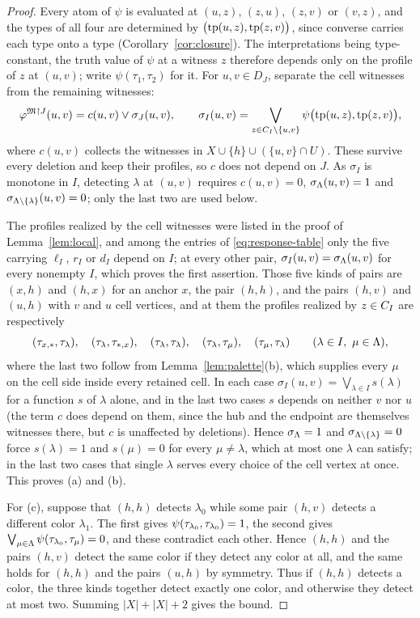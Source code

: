 \begin{proof}
Every atom of $\psi$ is evaluated at $(u,z)$, $(z,u)$, $(z,v)$ or $(v,z)$,
and the types of all four are determined by
$\bigl(\operatorname{tp}(u,z),\operatorname{tp}(z,v)\bigr)$, since converse carries each type onto a
type (Corollary~\ref{cor:closure}). The interpretations being
type-constant, the truth value of $\psi$ at a witness $z$ therefore depends
only on the profile of $z$ at $(u,v)$; write $\psi(\tau_1,\tau_2)$ for it.
For $u,v\in D_J$, separate the cell witnesses from the remaining
witnesses:
\[
 \varphi^{\mathfrak M\mathord{\restriction} J}(u,v)=c(u,v)\vee\sigma_J(u,v),\qquad
 \sigma_I(u,v)=\bigvee_{z\in C_{I}\setminus\{u,v\}}
 \psi\bigl(\operatorname{tp}(u,z),\operatorname{tp}(z,v)\bigr),
\]
where $c(u,v)$ collects the witnesses in $X\cup\{h\}\cup(\{u,v\}\cap U)$.
These survive every deletion and keep their profiles, so $c$ does not depend
on $J$. As $\sigma_I$ is monotone in $I$, detecting $\lambda$ at $(u,v)$
requires $c(u,v)=0$, $\sigma_{\Lambda}(u,v)=1$ and
$\sigma_{\Lambda\setminus\{\lambda\}}(u,v)=0$; only the last two are used
below.

The profiles realized by the cell witnesses were listed in the proof of
Lemma~\ref{lem:local}, and among the entries of \eqref{eq:response-table}
only the five carrying $\ell_I$, $r_I$ or $d_I$ depend on $I$; at every
other pair, $\sigma_I(u,v)=\sigma_{\Lambda}(u,v)$ for every nonempty $I$,
which proves the first assertion. Those five kinds of pairs are $(x,h)$ and
$(h,x)$ for an anchor $x$, the pair $(h,h)$, and the pairs $(h,v)$ and
$(u,h)$ with $v$ and $u$ cell vertices, and at them the profiles realized
by $z\in C_{I}$ are respectively
\[
 (\tau_{x,\ast},\tau_{\lambda}),\quad
 (\tau_{\lambda},\tau_{\ast,x}),\quad
 (\tau_{\lambda},\tau_{\lambda}),\quad
 (\tau_{\lambda},\tau_{\mu}),\quad
 (\tau_{\mu},\tau_{\lambda})
 \qquad(\lambda\in I,\ \mu\in\Lambda),
\]
where the last two follow from Lemma~\ref{lem:palette}(b), which supplies
every $\mu$ on the cell side inside every retained cell. In each case
$\sigma_I(u,v)=\bigvee_{\lambda\in I}s(\lambda)$ for a function $s$ of
$\lambda$ alone, and in the last two cases $s$ depends on neither $v$ nor
$u$ (the term $c$ does depend on them, since the hub and the endpoint are
themselves witnesses there, but $c$ is unaffected by deletions). Hence
$\sigma_{\Lambda}=1$ and $\sigma_{\Lambda\setminus\{\lambda\}}=0$ force
$s(\lambda)=1$ and $s(\mu)=0$ for every $\mu\ne\lambda$, which at most one
$\lambda$ can satisfy; in the last two cases that single $\lambda$ serves
every choice of the cell vertex at once. This proves (a) and (b).

For (c), suppose that $(h,h)$ detects $\lambda_0$ while some pair $(h,v)$
detects a different color $\lambda_1$. The first gives
$\psi(\tau_{\lambda_0},\tau_{\lambda_0})=1$, the second gives
$\bigvee_{\mu\in\Lambda}\psi(\tau_{\lambda_0},\tau_{\mu})=0$, and these
contradict each other. Hence $(h,h)$ and the pairs $(h,v)$ detect the same
color if they detect any color at all, and the same holds for $(h,h)$ and
the pairs $(u,h)$ by symmetry. Thus if $(h,h)$ detects a color, the three
kinds together detect exactly one color, and otherwise they detect at most
two. Summing $|X|+|X|+2$ gives the bound.
\end{proof}
